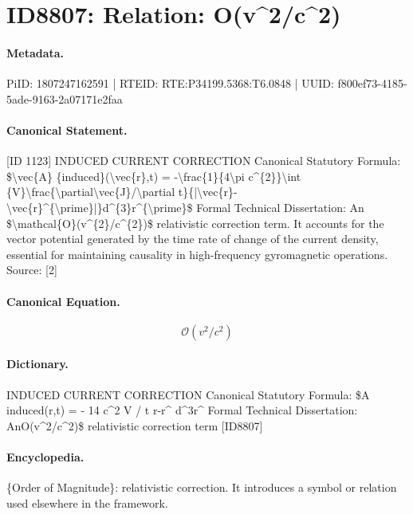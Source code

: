 \section*{ID8807: Relation: O(v\textasciicircum{}2/c\textasciicircum{}2)}
\paragraph{Metadata.}
PiID: 1807247162591 | RTEID: RTE:P34199.5368:T6.0848 | UUID: f800ef73-4185-5ade-9163-2a07171e2faa

\paragraph{Canonical Statement.}
[ID 1123] INDUCED CURRENT CORRECTION Canonical Statutory Formula: \$\textbackslash{}vec\{A\} \{induced\}(\textbackslash{}vec\{r\},t) = -\textbackslash{}frac\{1\}\{4\textbackslash{}pi c\textasciicircum{}\{2\}\}\textbackslash{}int \{V\}\textbackslash{}frac\{\textbackslash{}partial\textbackslash{}vec\{J\}/\textbackslash{}partial t\}\{|\textbackslash{}vec\{r\}-\textbackslash{}vec\{r\}\textasciicircum{}\{\textbackslash{}prime\}|\}d\textasciicircum{}\{3\}r\textasciicircum{}\{\textbackslash{}prime\}\$ Formal Technical Dissertation: An \$\textbackslash{}mathcal\{O\}(v\textasciicircum{}\{2\}/c\textasciicircum{}\{2\})\$ relativistic correction term. It accounts for the vector potential generated by the time rate of change of the current density, essential for maintaining causality in high-frequency gyromagnetic operations. Source: [2]

\paragraph{Canonical Equation.}
\[
\mathcal{O}(v^{2}/c^{2})
\]

\paragraph{Dictionary.}
INDUCED CURRENT CORRECTION Canonical Statutory Formula: \$A induced(r,t) = - 14 c\textasciicircum{}2 V / t r-r\textasciicircum{} d\textasciicircum{}3r\textasciicircum{} Formal Technical Dissertation: AnO(v\textasciicircum{}2/c\textasciicircum{}2)\$ relativistic correction term [ID8807]

\paragraph{Encyclopedia.}
\{Order of Magnitude\}: relativistic correction. It introduces a symbol or relation used elsewhere in the framework.
